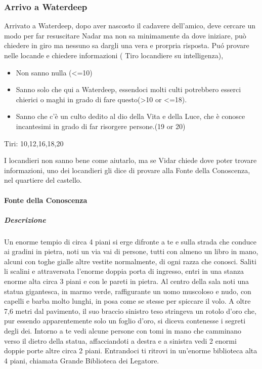 \documentclass{article}
\begin{document}
            \subsubsection{Arrivo a Waterdeep} 
                 Arrivato a Waterdeep, dopo aver nascosto il cadavere dell'amico, deve cercare un modo per far resuscitare Nadar ma non sa minimamente da dove iniziare, può chiedere in giro ma nessuno sa dargli una vera e prorpria risposta. Puó provare nelle locande e chiedere informazioni ( Tiro locandiere su intelligenza), 
                 \begin{itemize}
                    \item Non sanno nulla (<=10)
                    \item Sanno solo che qui a Waterdeep, essendoci molti culti potrebbero esserci chierici o maghi in grado di fare questo(>10 or <=18).
                    \item Sanno che c'è un culto dedito al dio della Vita e della Luce, che è conosce incantesimi in grado di far risorgere persone.(19 or 20)
                 \end{itemize}
                 Tiri: 10,12,16,18,20

                 I locandieri non sanno bene come aiutarlo, ma se Vidar chiede dove poter trovare informazioni, uno dei locandieri gli dice di provare alla Fonte della Conoscenza, nel quartiere del castello. 
                 \paragraph{Fonte della Conoscenza }
                 \subparagraph{Descrizione} Un enorme tempio di circa 4 piani si erge difronte a te e sulla strada che conduce ai gradini in pietra, noti un via vai di persone, tutti con almeno un libro in mano, alcuni con toghe gialle altre vestite normalmente, di ogni razza che conosci. Saliti li scalini e attraversata l'enorme doppia porta di ingresso, entri in una stanza enorme alta circa 3 piani e con le pareti in pietra. Al centro della sala noti una statua gigantesca, in marmo verde, raffigurante un uomo muscoloso e nudo, con capelli e barba molto lunghi, in posa come se stesse per spiccare il volo. A oltre 7,6 metri dal pavimento, il suo braccio sinistro teso stringeva un rotolo d'oro che, pur essendo apparentemente solo un foglio d'oro, si diceva contenesse i segreti degli dei.
                  Intorno a te vedi alcune persone con tomi in mano che camminano verso il dietro della statua, affacciandoti a destra e a sinistra vedi 2 enormi doppie porte altre circa 2 piani. Entrandoci ti ritrovi in un'enorme biblioteca alta 4 piani, chiamata Grande Biblioteca dei Legatore. 
                
\end{document}
